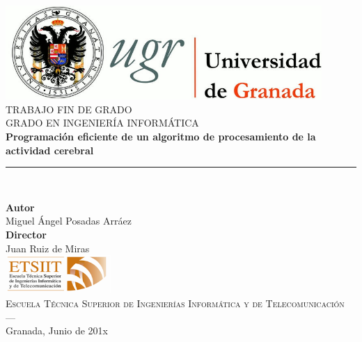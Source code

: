 \begin{titlepage}
\newlength{\centeroffset}
\setlength{\centeroffset}{-0.5\oddsidemargin}
\addtolength{\centeroffset}{0.5\evensidemargin}
\thispagestyle{empty}

\noindent\hspace*{\centeroffset}\begin{minipage}{\textwidth}

\centering
\includegraphics[width=0.9\textwidth]{logos/logo_ugr.jpg}\\[1.4cm]

\textsc{ \Large TRABAJO FIN DE GRADO\\[0.2cm]}
\textsc{ GRADO EN INGENIERÍA INFORMÁTICA}\\[1cm]

{\Huge\bfseries Programación eficiente de un algoritmo de procesamiento de la actividad cerebral \\}
\noindent\rule[-1ex]{\textwidth}{3pt}\\[3.5ex]
\end{minipage}

\vspace{1cm}
\noindent\hspace*{\centeroffset}
\begin{minipage}{\textwidth}
\centering

\textbf{Autor}\\ {Miguel Ángel Posadas Arráez}\\[2.5ex]
\textbf{Director}\\ Juan Ruiz de Miras\\[2cm]
\includegraphics[width=0.3\textwidth]{logos/etsiit_logo.png}\\[0.1cm]
\textsc{Escuela Técnica Superior de Ingenierías Informática y de Telecomunicación}\\
\textsc{---}\\
Granada, Junio de 201x
\end{minipage}
\end{titlepage}
